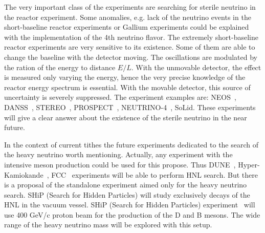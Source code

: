 \documentclass[../main.tex]{subfiles}
\begin{document}
The very important class of the experiments are searching for sterile neutrino in the reactor experiment. Some anomalies, e.g. lack of the neutrino events in the short-baseline reactor experiments or Gallium experiments could be explained with the implementation of the 4th neutrino flavor. The extremely short-baseline reactor experiments are very sensitive to its existence. Some of them are able to change the baseline with the detector moving. The oscillations are modulated by the ration of the energy to distance $E/L$. With the unmovable detector, the effect is measured only varying the energy, hence the very precise knowledge of the reactor energy spectrum is essential. With the movable detector, this source of uncertainty is severely suppressed. The experiment examples are: NEOS~\cite{Ko2017}, DANSS~\cite{Alekseev2018}, STEREO~\cite{Almazan2018}, PROSPECT~\cite{Ashenfelter2018}, NEUTRINO-4~\cite{Serebrov2015}, SoLid. These experiments will give a clear answer about the existence of the sterile neutrino in the near future.

In the context of current tithes the future experiments dedicated to the search of the heavy neutrino worth mentioning. Actually, any experiment with the intensive meson production could be used for this propose. Thus DUNE~\cite{Acciarri2016}, Hyper-Kamiokande~\cite{Proto-Collaboration2018}, FCC~\cite{Collaboration2019} experiments will be able to perform HNL search. But there is a proposal of the standalone experiment aimed only for the heavy neutrino search. SHiP (Search for Hidden Particles) will study exclusively decays of the HNL in the vacuum vessel. SHiP (Search for Hidden Particles) experiment~\cite{SHiPCollaboration2018a} will use 400 GeV/c proton beam for the production of the D and B mesons. The wide range of the heavy neutrino mass will be explored with this setup.
\end{document}
